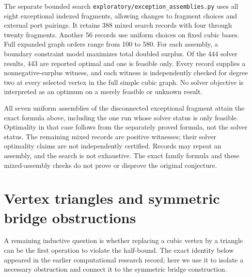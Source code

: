 \documentclass[11pt]{article}
\begin{document}
The separate bounded search \texttt{exploratory/exception\_assemblies.py}
uses all eight exceptional indexed fragments, allowing changes to
fragment choices and external port pairings. It retains 388 mixed
search records with four through twenty fragments. Another 56
records use uniform choices on fixed cubic bases. Full expanded
graph orders range from 100 to 580. For each assembly, a boundary
constraint model maximizes total doubled surplus. Of the 444 solver
results, 443 are reported optimal and one is feasible only. Every
record supplies a nonnegative-surplus witness, and each witness is
independently checked for degree two at every selected vertex in
the full simple cubic graph. No solver objective is interpreted as
an optimum on a merely feasible or unknown result.

All seven uniform assemblies of the disconnected exceptional
fragment attain the exact formula above, including the one run
whose solver status is only feasible. Optimality in that case follows
from the separately proved formula, not the solver status.
The remaining mixed records are positive witnesses; their solver
optimality claims are not independently certified. Records may repeat
an assembly, and the search is not exhaustive. The exact family
formula and these mixed-assembly checks do not prove or disprove
the original conjecture.

\section{Vertex triangles and symmetric bridge obstructions}
\label{sec:round23}
A remaining inductive question is whether replacing a cubic vertex
by a triangle can be the first operation to violate the half-bound.
The exact identity below appeared in the earlier computational
research record; here we use it to isolate a necessary obstruction
and connect it to the symmetric bridge construction.
\end{document}

